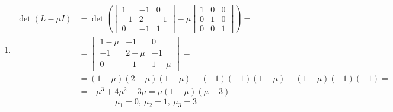\documentclass[a4paper,12pt]{article}
\theoremstyle{definition}%
\theoremstyle{definition}
\theoremstyle{problem}
\begin{document}
\begin{enumerate}[label=\Roman*)]
\item \begin{align*}
\det (L-\mu I)&= \det \left(\begin{bmatrix}
1&-1&0\\-1&2&-1\\0&-1&1
\end{bmatrix}-\mu \begin{bmatrix}
1&0&0\\0&1&0\\0&0&1
\end{bmatrix}\right)=\\
&=\begin{vmatrix}
1-\mu &-1    &0\\
-1    &2-\mu &-1\\
0     &-1    &1-\mu
\end{vmatrix} =\\ 
&= (1-\mu )(2-\mu)(1-\mu )-(-1)(-1)(1-\mu )-(1-\mu )(-1)(-1)=\\
&=-\mu ^3+4\mu ^2-3\mu =\mu (1-\mu )(\mu -3)
\end{align*}
$$\mu_1 = 0,\ \mu _2 = 1,\ \mu _3 = 3$$
\end{enumerate}
\end{document}
